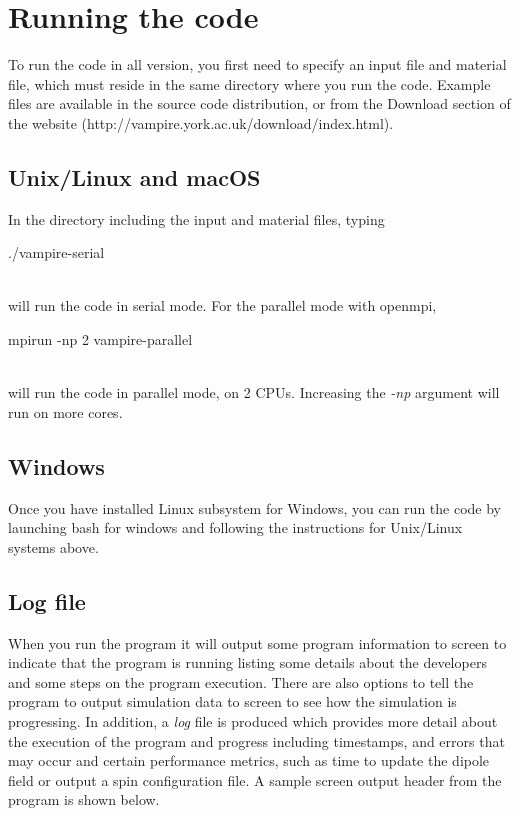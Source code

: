 %
%
%
%
\chapter{Running the code}
To run the code in all version, you first need to specify an input file and material file, which must reside in the same directory where you run the code. Example files are available in the source code distribution, or from the Download section of the website (http://vampire.york.ac.uk/download/index.html).

\section*{Unix/Linux and macOS}
In the directory including the input and material files, typing\\

\begin{minipage}[c]{\textwidth}
\centering
./vampire-serial
\end{minipage}\\

\noindent will run the code in serial mode. For the parallel mode with openmpi,\\

\begin{minipage}[c]{\textwidth}
\centering
mpirun -np 2 vampire-parallel
\end{minipage}\\

\noindent will run the code in parallel mode, on 2 CPUs. Increasing the \textit{-np} argument will run on more cores.

\section*{Windows}
Once you have installed Linux subsystem for Windows, you can run the code by launching bash for windows and following the instructions for Unix/Linux systems above.

\section*{Log file}
When you run the program it will output some program information to screen to indicate that the program is running listing some details about the developers and some steps on the program execution. There are also options to tell the program to output simulation data to screen to see how the simulation is progressing. In addition, a \textit{log} file is produced which provides more detail about the execution of the program and progress including timestamps, and errors that may occur and certain performance metrics, such as time to update the dipole field or output a spin configuration file. A sample screen output header from the program is shown below.\\


